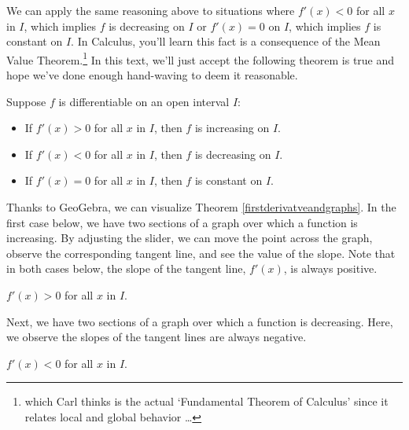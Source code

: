\documentclass{ximera}
\begin{document}
We can apply the same reasoning above to situations where $f'(x)<0$ for all $x$ in $I$, which implies $f$ is decreasing on $I$ or $f'(x) = 0$ on $I$, which implies $f$ is constant on $I$.  In Calculus, you'll learn this fact is a consequence of the Mean Value Theorem.\footnote{which Carl thinks is the actual `Fundamental Theorem of Calculus' since it relates local and global behavior \ldots}  In this text, we'll just accept the following theorem is true and hope we've done enough hand-waving to deem it reasonable.




\begin{theorem}  \label{firstderivatveandgraphs}   Suppose $f$ is differentiable on an open interval $I$:

\begin{itemize}

\item If $f'(x) > 0$ for all $x$ in $I$, then $f$ is increasing on $I$.  

\item If $f'(x) < 0$ for all $x$ in $I$, then $f$ is decreasing on $I$. 

\item If $f'(x) = 0$ for all $x$ in $I$, then $f$ is constant on $I$.


\end{itemize}

\end{theorem}

Thanks to GeoGebra, we can visualize Theorem \ref{firstderivatveandgraphs}.  In the first case below, we have two sections of a graph over which a function is increasing.  By adjusting the slider, we can move the point across the graph, observe the corresponding tangent line, and see the value of the slope.  Note that in both cases below, the slope of the tangent line, $f'(x)$, is always positive.


\begin{center}

 $f'(x) > 0$  for all $x$ in $I$.
\end{center}


Next,  we have two sections of a graph over which a function is decreasing.  Here, we observe the slopes of the tangent lines are always negative.

\begin{center}


$f'(x) < 0$  for all $x$ in $I$.
\end{center}
\end{document}

